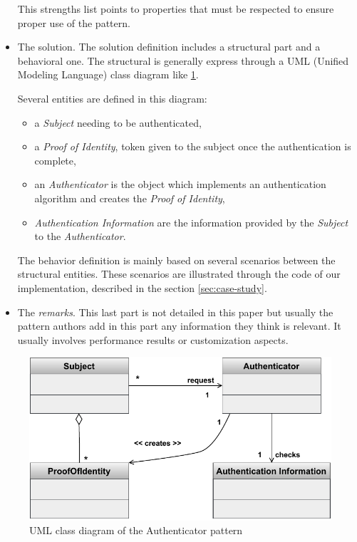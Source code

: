 \begin{itemize}
    This strengths list points to properties that must be respected to ensure proper use of the pattern.

    \item The solution. The solution definition includes a structural part and a behavioral one. The structural is generally express through a UML (Unified Modeling Language) class diagram like \ref{fig:authclasses}.
    
    Several entities are defined in this diagram:
    \begin{itemize}
        \item a \textit{Subject} needing to be authenticated,
        
        \item a \textit{Proof of Identity}, token given to the subject once the authentication is complete,
        
        \item an \textit{Authenticator} is the object which implements an authentication algorithm and creates the \textit{Proof of Identity},
        
        \item \textit{Authentication Information} are the information provided by the \textit{Subject} to the \textit{Authenticator}.
    \end{itemize}

The behavior definition is mainly based on several scenarios between the structural entities. These scenarios are illustrated through the code of our implementation, described in the section \ref{sec:case-study}.

    \item The \emph{remarks}. This last part is not detailed in this paper but usually the pattern authors add in this part any information they think is relevant. It usually involves performance results or customization aspects. 
\end{itemize}




\begin{figure}
    \centering
    \includegraphics[width=0.7\columnwidth]{figures/AuthenticatorPattern.pdf}
    \caption{UML class diagram of the Authenticator pattern}
    \label{fig:authclasses}
\end{figure}

